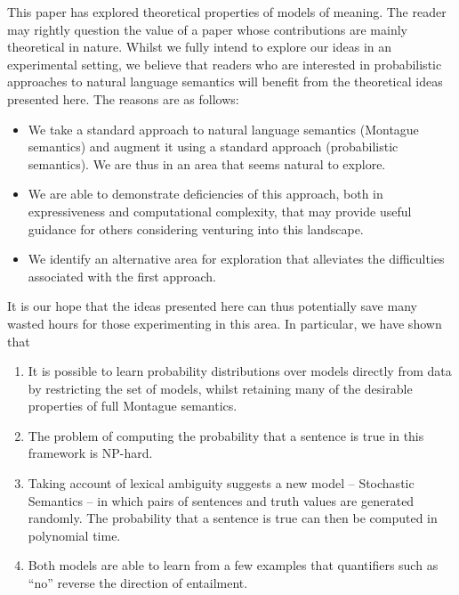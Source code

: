 \documentclass[11pt]{article}
\theoremstyle{definition}
\begin{document}
This paper has explored theoretical properties of models of meaning. The
reader may rightly question the value of a paper whose contributions
are mainly theoretical in nature. Whilst we fully intend to explore
our ideas in an experimental setting, we believe that readers who are
interested in probabilistic approaches to natural language semantics
will benefit from the theoretical ideas presented here. 
The reasons
are as follows:
\begin{itemize}
\item We take a standard approach to natural language semantics
  (Montague semantics) and augment it using a standard approach
  (probabilistic semantics). We are thus in an area that seems natural
  to explore.
\item We are able to demonstrate deficiencies of this approach, both
  in expressiveness and computational complexity, that may provide
  useful guidance for others considering venturing into this
  landscape.
\item We identify an alternative area for exploration that alleviates
  the difficulties associated with the first approach.
\end{itemize}

It is our hope that the ideas presented here can thus potentially save
many wasted hours for those experimenting in this area. In particular, we have shown that
\begin{enumerate}
\item It is possible to learn probability
  distributions over models directly from data by restricting the set of models,
  whilst retaining many of the desirable properties of full Montague
  semantics.
\item The problem of computing the probability that a
  sentence is true in this framework is NP-hard.
\item Taking account of lexical ambiguity suggests a new
  model -- Stochastic Semantics -- in which pairs of sentences and truth values are generated
  randomly. The probability that a sentence is true can then be
  computed in polynomial time.
\item Both models are able to learn from a few examples
  that quantifiers such as ``no'' reverse the direction of entailment.
\end{enumerate}

%
\end{document}
